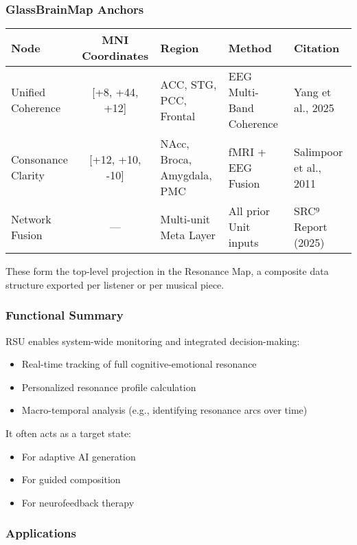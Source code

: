 \documentclass[10pt]{article}
\begin{document}
\subsubsection*{GlassBrainMap Anchors}

\begin{center}
\begin{tabular}{|l|c|l|l|l|}
\hline
\textbf{Node} & \textbf{MNI Coordinates} & \textbf{Region} & \textbf{Method} & \textbf{Citation} \\
\hline
Unified Coherence & [+8, +44, +12] & ACC, STG, PCC, Frontal & EEG Multi-Band Coherence & Yang et al., 2025 \\
Consonance Clarity & [+12, +10, -10] & NAcc, Broca, Amygdala, PMC & fMRI + EEG Fusion & Salimpoor et al., 2011 \\
Network Fusion & — & Multi-unit Meta Layer & All prior Unit inputs & SRC⁹ Report (2025) \\
\hline
\end{tabular}
\end{center}

These form the top-level projection in the Resonance Map, a composite data structure exported per listener or per musical piece.

\subsubsection*{Functional Summary}

RSU enables system-wide monitoring and integrated decision-making:

\begin{itemize}
    \item Real-time tracking of full cognitive-emotional resonance
    \item Personalized resonance profile calculation
    \item Macro-temporal analysis (e.g., identifying resonance arcs over time)
\end{itemize}

It often acts as a target state:

\begin{itemize}
    \item For adaptive AI generation
    \item For guided composition
    \item For neurofeedback therapy
\end{itemize}

\subsubsection*{Applications}
\end{document}
